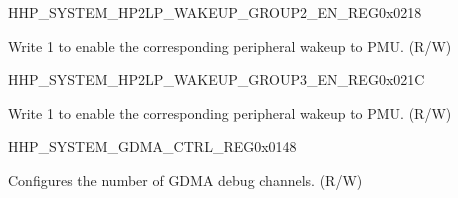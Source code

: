 {\begin{register}{H}{HP\_SYSTEM\_HP2LP\_WAKEUP\_GROUP2\_EN\_REG}{0x0218}\label{regdesc:HPSYSTEMHP2LPWAKEUPGROUP2ENREG}
%
\regnewline%
\begin{regdesc}\begin{reglist}
\label{fielddesc:HPSYSTEMH2LPWAKEUPGROUP2EN}\item [HP\_SYSTEM\_H2LP\_WAKEUP\_GROUP2\_EN] Write 1 to enable the corresponding peripheral wakeup to PMU. (R/W)
\end{reglist}\end{regdesc}
\end{register}


\begin{register}{H}{HP\_SYSTEM\_HP2LP\_WAKEUP\_GROUP3\_EN\_REG}{0x021C}\label{regdesc:HPSYSTEMHP2LPWAKEUPGROUP3ENREG}
%
%
\regnewline%
\begin{regdesc}\begin{reglist}
\label{fielddesc:HPSYSTEMH2LPWAKEUPGROUP3EN}\item [HP\_SYSTEM\_H2LP\_WAKEUP\_GROUP3\_EN] Write 1 to enable the corresponding peripheral wakeup to PMU. (R/W)
\end{reglist}\end{regdesc}
\end{register}

}


\begin{register}{H}{HP\_SYSTEM\_GDMA\_CTRL\_REG}{0x0148}\label{regdesc:HPSYSTEMGDMACTRLREG}
%
%
\regnewline%
\begin{regdesc}\begin{reglist}
\label{fielddesc:HPSYSTEMSYSDEBUGCHNUM}\item [HP\_SYSTEM\_SYS\_DEBUG\_CH\_NUM] Configures the number of GDMA debug channels. (R/W)
\end{reglist}\end{regdesc}
\end{register}


